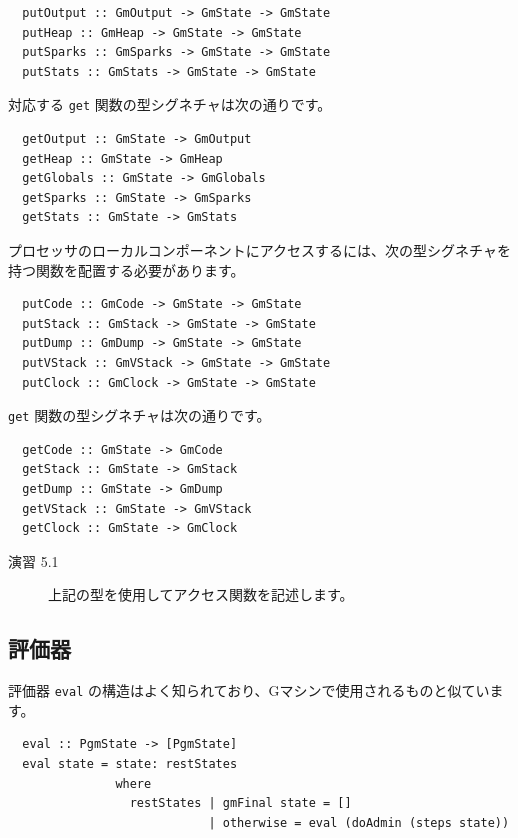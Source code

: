 \documentclass{jbook}
\begin{document}
\begin{verbatim}
  putOutput :: GmOutput -> GmState -> GmState
  putHeap :: GmHeap -> GmState -> GmState
  putSparks :: GmSparks -> GmState -> GmState
  putStats :: GmStats -> GmState -> GmState
\end{verbatim}

対応する \texttt{get} 関数の型シグネチャは次の通りです。

\begin{verbatim}
  getOutput :: GmState -> GmOutput
  getHeap :: GmState -> GmHeap
  getGlobals :: GmState -> GmGlobals
  getSparks :: GmState -> GmSparks
  getStats :: GmState -> GmStats
\end{verbatim}

プロセッサのローカルコンポーネントにアクセスするには、次の型シグネチャを持つ関数を配置する必要があります。

\begin{verbatim}
  putCode :: GmCode -> GmState -> GmState
  putStack :: GmStack -> GmState -> GmState
  putDump :: GmDump -> GmState -> GmState
  putVStack :: GmVStack -> GmState -> GmState
  putClock :: GmClock -> GmState -> GmState
\end{verbatim}

\texttt{get} 関数の型シグネチャは次の通りです。

\begin{verbatim}
  getCode :: GmState -> GmCode
  getStack :: GmState -> GmStack
  getDump :: GmState -> GmDump
  getVStack :: GmState -> GmVStack
  getClock :: GmState -> GmClock
\end{verbatim}

\begin{description}
	\item[演習 5.1] 上記の型を使用してアクセス関数を記述します。
\end{description}

\subsection{評価器}

評価器 \texttt{eval} の構造はよく知られており、Gマシンで使用されるものと似ています。

\begin{verbatim}
  eval :: PgmState -> [PgmState]
  eval state = state: restStates
               where
                 restStates | gmFinal state = []
                            | otherwise = eval (doAdmin (steps state))
\end{verbatim}
\end{document}
